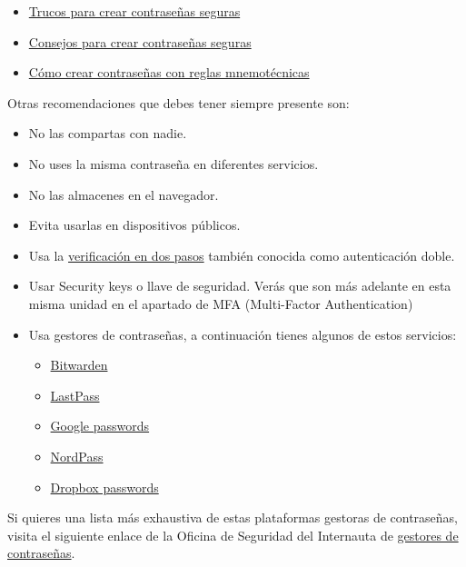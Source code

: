 \documentclass[
  a4paper,
  openany]{book}
\providecommand{\tightlist}{%
  \setlength{\itemsep}{0pt}\setlength{\parskip}{0pt}}
\begin{document}
\begin{itemize}
\item
  \href{https://www.pandasecurity.com/es/mediacenter/seguridad/10-trucos-para-crear-contrasenas-seguras/}{Trucos para crear contraseñas seguras}
\item
  \href{https://www.genbeta.com/seguridad/especial-contrasenas-seguras-consejos-para-mejorar-la-seguridad-de-tus-contrasenas}{Consejos para crear contraseñas seguras}
\item
  \href{https://www.youtube.com/watch?v=dRSiu13_AUk}{Cómo crear contraseñas con reglas mnemotécnicas}
\end{itemize}

Otras recomendaciones que debes tener siempre presente son:

\begin{itemize}
\item
  No las compartas con nadie.
\item
  No uses la misma contraseña en diferentes servicios.
\item
  No las almacenes en el navegador.
\item
  Evita usarlas en dispositivos públicos.
\item
  Usa la \href{https://www.osi.es/es/actualidad/blog/2019/02/27/el-factor-de-autenticacion-doble-y-multiple}{verificación en dos pasos} también conocida como autenticación doble.
\item
  Usar Security keys o llave de seguridad. Verás que son más adelante en esta misma unidad en el apartado de MFA (Multi-Factor Authentication)
\item
  Usa gestores de contraseñas, a continuación tienes algunos de estos servicios:

  \begin{itemize}
  \tightlist
  \item
    \href{https://bitwarden.com/}{Bitwarden}
  \item
    \href{https://www.lastpass.com/es/}{LastPass}
  \item
    \href{https://passwords.google.com/}{Google passwords}
  \item
    \href{https://nordpass.com/homepage/}{NordPass}
  \item
    \href{https://www.dropbox.com/es_ES/features/security/passwords}{Dropbox passwords}
  \end{itemize}
\end{itemize}

Si quieres una lista más exhaustiva de estas plataformas gestoras de contraseñas, visita el siguiente enlace de la Oficina de Seguridad del Internauta de \href{https://www.osi.es/es/herramientas-gratuitas/categoria/privacidad-y-seguridad-de-datos/cifrado-de-datos-y-gestion-de-contrasenas}{gestores de contraseñas}.
\end{document}
